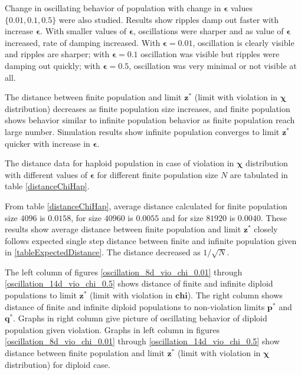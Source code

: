 Change in oscillating behavior of population with change in $\bm{\epsilon}$ values $\{0.01, 0.1, 0.5\}$ were also studied. 
Results show ripples damp out faster with increase $\bm{\epsilon}$.
With smaller values of $\bm{\epsilon}$, oscillations were sharper and as value of $\bm{\epsilon}$ increased, 
rate of damping increased. With $\bm{\epsilon} = 0.01$, oscillation is clearly visible and ripples are sharper; with $\bm{\epsilon} = 0.1$ oscillation was visible 
but ripples were damping out quickly;  with $\bm{\epsilon} = 0.5$, oscillation was very minimal or not visible at all. 

The distance between finite population and limit $\bm{z}^\ast$ (limit with violation in $\bm{\chi}$ distribution) decreases as finite population size increases,
and finite population shows behavior similar to infinite population behavior as finite population reach large number. Simulation results show infinite population converges 
to limit $\bm{z^\ast}$ quicker with increase in $\bm{\epsilon}$. 

The distance data for haploid population in case of violation in $\bm{\chi}$ distribution 
with different values of $\bm{\epsilon}$ for different finite population size $N$ are tabulated in table \ref{distanceChiHap}.


From table \ref{distanceChiHap}, 
average distance calculated for finite population size $4096$ is $0.0158$, 
for size $40960$ is $0.0055$ and for size $81920$ is $0.0040$.
These results show average distance 
between finite population and limit $\bm{z^\ast}$ closely follows expected single step distance 
between finite and infinite population given in \ref{tableExpectedDistance}. The distance decreased as $1/\sqrt{N}$.


The left column of figures \ref{oscillation_8d_vio_chi_0.01} through \ref{oscillation_14d_vio_chi_0.5} 
shows distance of finite and infinite diploid populations to limit $\bm{z^\ast}$ (limit with violation in $\bm{chi}$). The 
right column shows distance of finite and infinite diploid populations to non-violation limits $\bm{p^\ast}$ and $\bm{q^\ast}$. 
Graphs in right column give picture of oscillating behavior of diploid population given violation. 
Graphs in left column in figures \ref{oscillation_8d_vio_chi_0.01} through \ref{oscillation_14d_vio_chi_0.5} show distance 
between finite population and limit $\bm{z}^\ast$ (limit with violation in $\bm{\chi}$ distribution) for diploid case.

